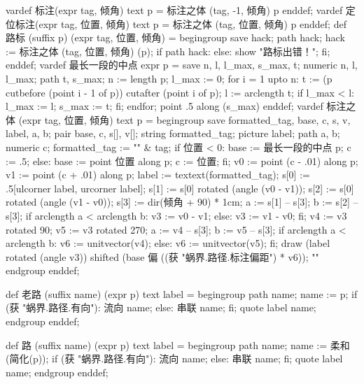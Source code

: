 \startMPinclusions[+]
vardef 标注(expr tag, 倾角) text p =
  标注之体 (tag, -1, 倾角) p
enddef;
vardef 定位标注(expr tag, 位置, 倾角) text p =
  标注之体 (tag, 位置, 倾角) p
enddef;
def 路标 (suffix p) (expr tag, 位置, 倾角) =
  begingroup
    save hack; path hack;
    hack := 标注之体 (tag, 位置, 倾角) (p);
    if path hack:
    else:
      show "路标出错！";
    fi;
enddef;
vardef 最长一段的中点 expr p =
  save n, l, l_max, s_max, t;
  numeric n, l, l_max; path t, s_max;
  n := length p;
  l_max := 0;
  for i = 1 upto n:
    t := (p cutbefore (point i - 1 of p)) cutafter (point i of p);
    l := arclength t;
    if l_max < l:
      l_max := l; s_max := t;
    fi;
  endfor;
  point .5 along (s_max)
enddef;
vardef 标注之体 (expr tag, 位置, 倾角) text p =
  begingroup
    save formatted_tag, base, c, s, v, label, a, b;
    pair base, c, s[], v[]; string formatted_tag; picture label; path a, b; numeric c;
    formatted_tag := "\tfx" & tag;
    if 位置 < 0:
      base := 最长一段的中点 p;
      c := .5;
    else:
      base := point 位置 along p;
      c := 位置;
    fi;
    v0 := point (c - .01) along p;
    v1 := point (c + .01) along p;
    label := textext(formatted_tag);
    s[0] := .5[ulcorner label, urcorner label];
    s[1] := s[0] rotated (angle (v0 - v1));
    s[2] := s[0] rotated (angle (v1 - v0));
    s[3] := dir(倾角 + 90) * 1cm; %
    a := s[1] -- s[3];
    b := s[2] -- s[3];
    if arclength a < arclength b:
      v3 := v0 - v1;
    else:
      v3 := v1 - v0;
    fi;
    v4 := v3 rotated 90;
    v5 := v3 rotated 270;
    a := v4 -- s[3];
    b := v5 -- s[3];
    if arclength a < arclength b:
      v6 := unitvector(v4);
    else:
      v6 := unitvector(v5);
    fi;
    draw (label rotated (angle v3)) shifted (base 偏 ((获 "蜗界.路径.标注偏距") * v6));
    ""
  endgroup
enddef;
\stopMPinclusions

\startMPinclusions[+]
def 老路 (suffix name) (expr p) text label =
  begingroup
  path name; name := p;
  if (获 "蜗界.路径.有向"):
    流向 name;
  else:
    串联 name;
  fi;
  quote label name;
  endgroup
enddef;

def 路 (suffix name) (expr p) text label =
  begingroup
  path name; name := 柔和(简化(p));
  if (获 "蜗界.路径.有向"):
    流向 name;
  else:
    串联 name;
  fi;
  quote label name;
  endgroup
enddef;
\stopMPinclusions

